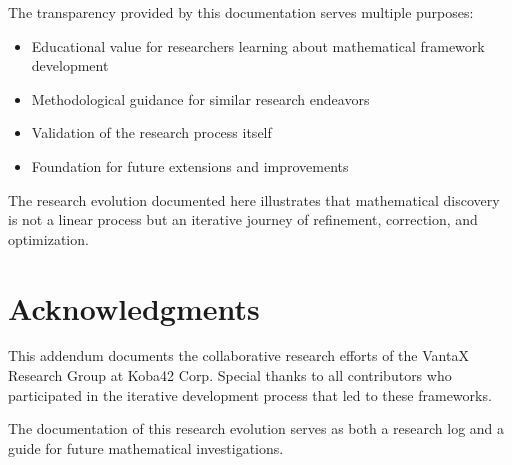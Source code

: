 \documentclass[12pt]{article}
\begin{document}
The transparency provided by this documentation serves multiple purposes:
\begin{itemize}
    \item Educational value for researchers learning about mathematical framework development
    \item Methodological guidance for similar research endeavors
    \item Validation of the research process itself
    \item Foundation for future extensions and improvements
\end{itemize}

The research evolution documented here illustrates that mathematical discovery is not a linear process but an iterative journey of refinement, correction, and optimization.

\section{Acknowledgments}

This addendum documents the collaborative research efforts of the VantaX Research Group at Koba42 Corp. Special thanks to all contributors who participated in the iterative development process that led to these frameworks.

The documentation of this research evolution serves as both a research log and a guide for future mathematical investigations.



\end{document}
